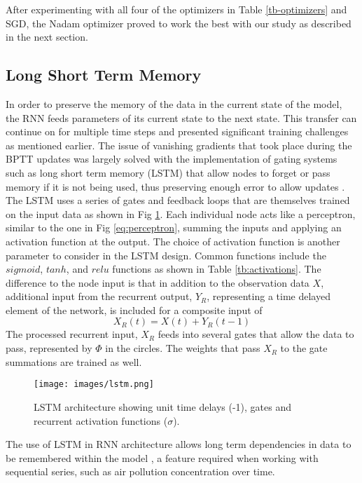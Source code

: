 \begin{linenumbers}
%
After experimenting with all four of the optimizers in Table \ref{tb-optimizers} and SGD, the Nadam optimizer proved to work the best with our study as described in the next section.

\subsection{Long Short Term Memory}

In order to preserve the memory of the data in the current state of the model, the RNN feeds parameters of its current state to the next state. This transfer can continue on for multiple time steps and presented significant training challenges as mentioned earlier. The issue of vanishing gradients that took place during the BPTT updates was largely solved with the implementation of gating systems such as long short term memory (LSTM) that allow nodes to forget or pass memory if it is not being used, thus preserving enough error to allow updates \citep{Hochreiter1997}. The LSTM uses a series of gates and feedback loops that are themselves trained on the input data as shown in Fig \ref{fig:lstm}. Each individual node acts like a perceptron, similar to the one in Fig \ref{eq:perceptron}, summing the inputs and applying an activation function at the output. The choice of activation function is another parameter to consider in the LSTM design. Common functions include the $sigmoid$, $tanh$, and $relu$ functions as shown in Table \ref{tb:activations}. The difference to the node input is that in addition to the observation data $X$, additional input from the recurrent output, $Y_{R}$, representing a time delayed element of the network, is included for a composite input of 
%
\begin{equation}
\label{eq:Xr}
X_{R}(t) = X(t) + Y_{R}(t-1)
\end{equation}
%
The processed recurrent input, $X_{R}$ feeds into several gates that allow the data to pass, represented by $\Phi$ in the circles. The weights that pass $X_{R}$ to the gate summations are trained as well.
%
\begin{figure}
\centering
\texttt{[image: images/lstm.png]} 
\caption[LSTM architecture]{LSTM architecture showing unit time delays (-1), gates and recurrent activation functions ($\sigma$).}
\label{fig:lstm}
\end{figure}
%
The use of LSTM in RNN architecture allows long term dependencies in data to be remembered within the model \citep{Graves2013a}, a feature required when working with sequential series,  such as air pollution concentration over time.


\end{linenumbers}
